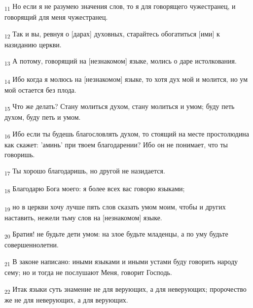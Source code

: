 \begin{tcolorbox}
\textsubscript{11} Но если я не разумею значения слов, то я для говорящего чужестранец, и говорящий для меня чужестранец.
\end{tcolorbox}
\begin{tcolorbox}
\textsubscript{12} Так и вы, ревнуя о [дарах] духовных, старайтесь обогатиться [ими] к назиданию церкви.
\end{tcolorbox}
\begin{tcolorbox}
\textsubscript{13} А потому, говорящий на [незнакомом] языке, молись о даре истолкования.
\end{tcolorbox}
\begin{tcolorbox}
\textsubscript{14} Ибо когда я молюсь на [незнакомом] языке, то хотя дух мой и молится, но ум мой остается без плода.
\end{tcolorbox}
\begin{tcolorbox}
\textsubscript{15} Что же делать? Стану молиться духом, стану молиться и умом; буду петь духом, буду петь и умом.
\end{tcolorbox}
\begin{tcolorbox}
\textsubscript{16} Ибо если ты будешь благословлять духом, то стоящий на месте простолюдина как скажет: 'аминь' при твоем благодарении? Ибо он не понимает, что ты говоришь.
\end{tcolorbox}
\begin{tcolorbox}
\textsubscript{17} Ты хорошо благодаришь, но другой не назидается.
\end{tcolorbox}
\begin{tcolorbox}
\textsubscript{18} Благодарю Бога моего: я более всех вас говорю языками;
\end{tcolorbox}
\begin{tcolorbox}
\textsubscript{19} но в церкви хочу лучше пять слов сказать умом моим, чтобы и других наставить, нежели тьму слов на [незнакомом] языке.
\end{tcolorbox}
\begin{tcolorbox}
\textsubscript{20} Братия! не будьте дети умом: на злое будьте младенцы, а по уму будьте совершеннолетни.
\end{tcolorbox}
\begin{tcolorbox}
\textsubscript{21} В законе написано: иными языками и иными устами буду говорить народу сему; но и тогда не послушают Меня, говорит Господь.
\end{tcolorbox}
\begin{tcolorbox}
\textsubscript{22} Итак языки суть знамение не для верующих, а для неверующих; пророчество же не для неверующих, а для верующих.
\end{tcolorbox}
